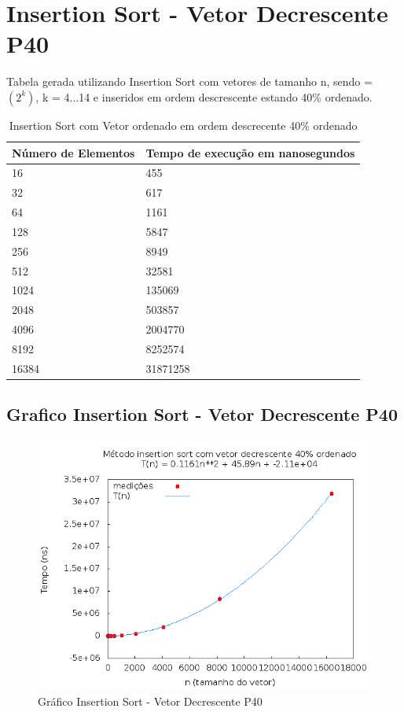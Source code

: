 \documentclass[12pt,a4paper,twoside]{report}
\begin{document}
\section{Insertion Sort - Vetor Decrescente P40}
Tabela gerada utilizando Insertion Sort com vetores de tamanho n, sendo = $(2^k)$, k = 4...14 e inseridos em ordem descrescente estando 40\% ordenado.

\begin{table}[H]
\centering
\caption{Insertion Sort com Vetor ordenado em ordem descrecente 40\% ordenado}
\label{my-label}
\begin{tabular}{|l|l|}
\hline
\multicolumn{1}{|c|}{\textbf{Número de Elementos}} & \multicolumn{1}{c|}{\textbf{Tempo de execução em nanosegundos}} \\ \hline
16 & 455 \\ \hline
32 & 617 \\ \hline
64 & 1161 \\ \hline
128 & 5847 \\ \hline
256 & 8949 \\ \hline
512 & 32581 \\ \hline
1024 & 135069 \\ \hline
2048 & 503857 \\ \hline
4096 & 2004770 \\ \hline
8192 & 8252574 \\ \hline
16384 & 31871258 \\ \hline
\end{tabular}
\end{table}

\subsection{Grafico Insertion Sort - Vetor Decrescente P40}
\begin{figure}[H]
    \centering
    \includegraphics[width=0.7\linewidth]{graficos/Insertion/vIntDecrescenteP40/vIntDecrescenteP40.png}
  \caption{Gráfico Insertion Sort - Vetor Decrescente P40}
\end{figure}
\end{document}
